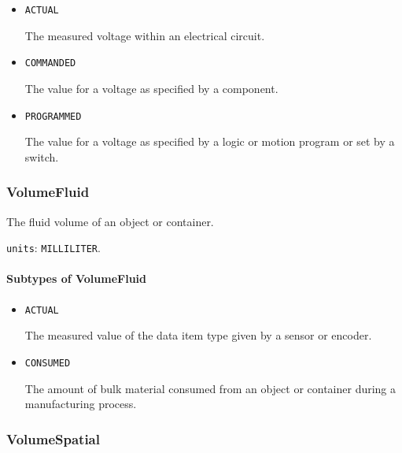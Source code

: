\begin{itemize}

\item \texttt{ACTUAL}


The measured voltage within an electrical circuit.

\item \texttt{COMMANDED}


The value for a voltage as specified by a  component.

\item \texttt{PROGRAMMED}


The value for a voltage as specified by a logic or motion program or set by a switch.


\end{itemize}






\subsubsection{VolumeFluid}
\label{sec:VolumeFluid}



The fluid volume of an object or container.


\texttt{units}: \texttt{MILLILITER}.

\paragraph{Subtypes of VolumeFluid}\mbox{}
\label{sec:Subtypes of VolumeFluid}

\begin{itemize}

\item \texttt{ACTUAL}


The measured value of the data item type given by a sensor or encoder.

\item \texttt{CONSUMED}


The amount of bulk material consumed from an object or container during a manufacturing process.


\end{itemize}





\subsubsection{VolumeSpatial}
\label{sec:VolumeSpatial}



